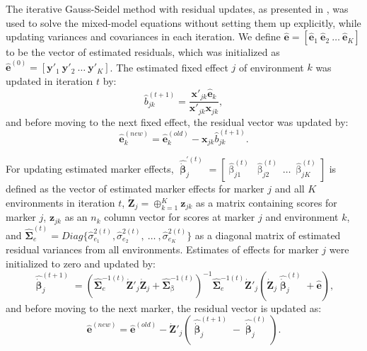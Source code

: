 \documentclass{bmcart}
\begin{document}
The iterative Gauss-Seidel method with residual updates, as presented in \cite{GSRU}, was used to solve the mixed-model equations without setting them up explicitly, while updating variances and covariances in each iteration. We define $\hat{\mathbf{e}} = [\hat{\mathbf{e}}_1~\hat{\mathbf{e}}_2~\hdots~\hat{\mathbf{e}}_K]$ to be the vector of estimated residuals, which was initialized as $\hat{\mathbf{e}}^{(0)} = [\mathbf{y}'_1~\mathbf{y}'_2~\hdots~\mathbf{y}'_K]$. The estimated fixed effect $j$ of environment $k$ was updated in iteration $t$ by:
\begin{equation}\nonumber
\label{eqn:MU1}
\hat{b}^{(t+1)}_{jk} = \frac{\mathbf{x}'_{jk}\hat{\mathbf{e}}_k}{
\mathbf{x}'_{jk}\mathbf{x}_{jk}},
\end{equation}
and before moving to the next fixed effect, the residual vector was updated by:
\begin{equation}\nonumber
\label{eqn:MU2}
\hat{\mathbf{e}}^{(new)}_k = \hat{\mathbf{e}}^{(old)}_k - \mathbf{x}_{jk}\hat{b}^{(t+1)}_{jk}.
\end{equation}

For updating estimated marker effects, $\hat{\dot{\mathbf{\upbeta}}}^{'(t)}_j = [\hat{\upbeta}^{(t)}_{j1}~\hat{\upbeta}^{(t)}_{j2}~\hdots~\hat{\upbeta}^{(t)}_{jK}]$ is defined as the vector of estimated marker effects for marker $j$ and all $K$ environments in iteration $t$, $\dot{\mathbf{Z}}_j = \oplus^{K}_{k=1} \mathbf{z}_{jk}$ as a matrix containing scores for marker $j$, $\mathbf{z}_{jk}$ as an $n_k$ column vector for scores at marker $j$ and environment $k$, and $\hat{\mathbf{\Sigma}}^{(t)}_{e} = Diag\{\hat{\sigma}^{2(t)}_{e_1},\hat{\sigma}^{2(t)}_{e_2},~\hdots~,\hat{\sigma}^{2(t)}_{e_K}\}$ as a diagonal matrix of estimated residual variances from all environments. Estimates of effects for marker $j$ were initialized to zero and updated by:
\begin{equation}%
\label{eqn:GS_B}
\hat{\dot{\mathbf{\upbeta}}}^{(t+1)}_j = (\hat{\mathbf{\Sigma}}^{-1(t)}_{e}\dot{\mathbf{Z}}'_j\dot{\mathbf{Z}}_j + \hat{\mathbf{\Sigma}}^{-1(t)}_{\upbeta})^{-1} \hat{\mathbf{\Sigma}}^{-1(t)}_{e}\dot{\mathbf{Z}}'_j (\dot{\mathbf{Z}}_j\hat{\dot{\mathbf{\upbeta}}}^{(t)}_j+\hat{\mathbf{e}}),
\end{equation}
and before moving to the next marker, the residual vector is updated as:
\begin{equation}\nonumber
\label{eqn:GS_E}
\hat{\mathbf{e}}^{(new)} = \hat{\mathbf{e}}^{(old)} -  \dot{\mathbf{Z}}'_j(\hat{\dot{\mathbf{\upbeta}}}^{(t+1)}_j - \hat{\dot{\mathbf{\upbeta}}}^{(t)}_j).
\end{equation}
\end{document}
